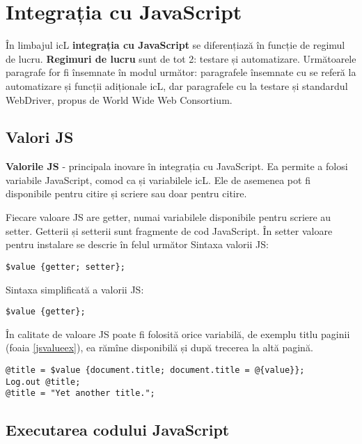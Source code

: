 \section{Integrația cu JavaScript}

În limbajul icL {\bf integrația cu JavaScript} se diferențiază în funcție de regimul de lucru. {\bf Regimuri de lucru} sunt de tot 2: testare și automatizare. Următoarele paragrafe for fi însemnate în modul următor: paragrafele însemnate cu \code{[icL]} se referă la automatizare și funcții adiționale icL, dar paragrafele cu \code{[w3c]} la testare și standardul WebDriver, propus de World Wide Web Consortium.

\subsection{Valori JS}

{\bf Valorile JS} - principala inovare în integrația cu JavaScript. Ea permite a folosi variabile JavaScript, comod ca și variabilele icL. Ele de asemenea pot fi disponibile pentru citire și scriere sau doar pentru citire.

Fiecare valoare JS are getter, numai variabilele disponibile pentru scriere au setter. Getterii și setterii sunt fragmente de cod JavaScript. În setter valoare pentru instalare se descrie în felul următor  Sintaxa valorii JS:
\begin{lstlisting}[numbers=none]
$value {getter; setter};
\end{lstlisting}

Sintaxa simplificată a valorii JS:
\begin{lstlisting}[numbers=none]
$value {getter};
\end{lstlisting}

În calitate de valoare JS poate fi folosită orice variabilă, de exemplu titlu paginii (foaia \ref{jsvalueex}), ea rămîne disponibilă și după trecerea la altă pagină.

\begin{lstlisting}[caption=Folosirea valorii JS, label=jsvalueex]
@title = $value {document.title; document.title = @{value}};
Log.out @title;
@title = "Yet another title.";
\end{lstlisting}

\subsection{Executarea codului JavaScript}

